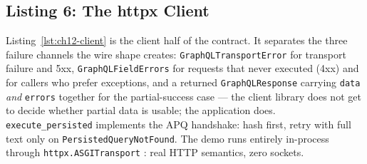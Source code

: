 \subsection{Listing 6: The httpx Client}
\label{subsec:ch12-code-client}

Listing~\ref{lst:ch12-client} is the client half of the contract. It
separates the three failure channels the wire shape creates:
\texttt{GraphQLTransportError} for transport failure and 5xx,
\texttt{GraphQLFieldErrors} for requests that never executed (4xx) and
for callers who prefer exceptions, and a returned
\texttt{GraphQLResponse} carrying \texttt{data} \emph{and}
\texttt{errors} together for the partial-success case --- the client
library does not get to decide whether partial data is usable; the
application does. \texttt{execute\_persisted} implements the APQ
handshake: hash first, retry with full text only on
\texttt{PersistedQueryNotFound}. The demo runs entirely in-process through
\texttt{httpx.ASGITransport} \cite{httpxdocs}: real HTTP semantics, zero
sockets.

